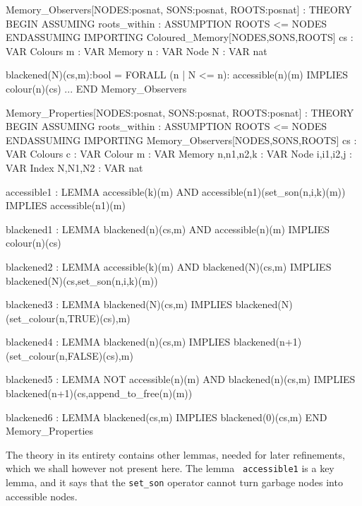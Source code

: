 \begin{smallsession}
Memory_Observers[NODES:posnat, SONS:posnat, ROOTS:posnat] : THEORY
BEGIN
  ASSUMING
    roots_within : ASSUMPTION ROOTS <= NODES
  ENDASSUMING
  IMPORTING Coloured_Memory[NODES,SONS,ROOTS]
  cs : VAR Colours
  m  : VAR Memory
  n  : VAR Node
  N  : VAR nat

  blackened(N)(cs,m):bool =
    FORALL (n | N <= n): accessible(n)(m) IMPLIES colour(n)(cs)
  ...
END Memory_Observers
\end{smallsession}
\label{observer-functions}

\begin{smallsession}
Memory_Properties[NODES:posnat, SONS:posnat, ROOTS:posnat] : THEORY
BEGIN
  ASSUMING roots_within : ASSUMPTION ROOTS <= NODES ENDASSUMING
  IMPORTING Memory_Observers[NODES,SONS,ROOTS]
  cs : VAR Colours c : VAR Colour m : VAR Memory n,n1,n2,k : VAR Node
  i,i1,i2,j : VAR Index N,N1,N2 : VAR nat

  accessible1 : LEMMA 
    accessible(k)(m) AND accessible(n1)(set_son(n,i,k)(m))
      IMPLIES accessible(n1)(m)

  blackened1 : LEMMA 
    blackened(n)(cs,m) AND accessible(n)(m) IMPLIES colour(n)(cs)

  blackened2 : LEMMA
    accessible(k)(m) AND blackened(N)(cs,m) 
      IMPLIES blackened(N)(cs,set_son(n,i,k)(m))

  blackened3 : LEMMA
    blackened(N)(cs,m) IMPLIES blackened(N)(set_colour(n,TRUE)(cs),m)

  blackened4 : LEMMA
    blackened(n)(cs,m) IMPLIES blackened(n+1)(set_colour(n,FALSE)(cs),m)

  blackened5 : LEMMA
    NOT accessible(n)(m) AND blackened(n)(cs,m)
      IMPLIES blackened(n+1)(cs,append_to_free(n)(m))

  blackened6 : LEMMA
    blackened(cs,m) IMPLIES blackened(0)(cs,m)
END Memory_Properties
\end{smallsession}
\label{function-lemmas-refinement1}

The  theory  in its entirety contains   other lemmas, needed for later
refinements, which we shall however not present  here.  The lemma {\tt
  accessible1} is a key lemma,  and it says   that the {\tt  set\_son}
operator cannot turn garbage nodes into accessible nodes.

